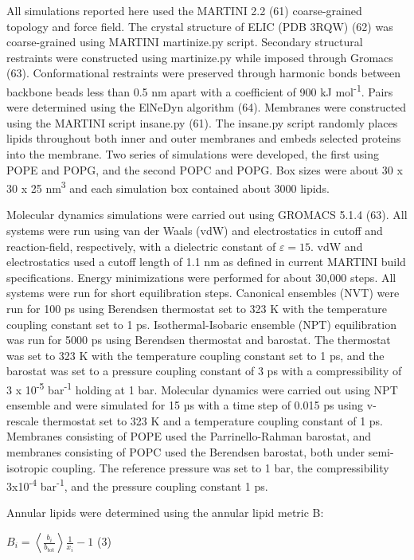 All simulations reported here used the MARTINI 2.2 (61) coarse-grained
topology and force field. The crystal structure of ELIC (PDB 3RQW) (62)
was coarse-grained using MARTINI martinize.py script. Secondary
structural restraints were constructed using martinize.py while imposed
through Gromacs (63). Conformational restraints were preserved through
harmonic bonds between backbone beads less than 0.5 nm apart with a
coefficient of 900 kJ mol\textsuperscript{-1}. Pairs were determined
using the ElNeDyn algorithm (64). Membranes were constructed using the
MARTINI script insane.py (61). The insane.py script randomly places
lipids throughout both inner and outer membranes and embeds selected
proteins into the membrane. Two series of simulations were developed,
the first using POPE and POPG, and the second POPC and POPG. Box sizes
were about 30 x 30 x 25 nm\textsuperscript{3} and each simulation box
contained about 3000 lipids.

Molecular dynamics simulations were carried out using GROMACS 5.1.4
(63). All systems were run using van der Waals (vdW) and electrostatics
in cutoff and reaction-field, respectively, with a dielectric constant
of \(\varepsilon = 15\). vdW and electrostatics used a cutoff length of
1.1 nm as defined in current MARTINI build specifications. Energy
minimizations were performed for about 30,000 steps. All systems were
run for short equilibration steps. Canonical ensembles (NVT) were run
for 100 ps using Berendsen thermostat set to 323 K with the temperature
coupling constant set to 1 ps. Isothermal-Isobaric ensemble (NPT)
equilibration was run for 5000 ps using Berendsen thermostat and
barostat. The thermostat was set to 323 K with the temperature coupling
constant set to 1 ps, and the barostat was set to a pressure coupling
constant of 3 ps with a compressibility of 3 x 10\textsuperscript{-5}
bar\textsuperscript{-1} holding at 1 bar. Molecular dynamics were
carried out using NPT ensemble and were simulated for 15 µs with a time
step of 0.015 ps using v-rescale thermostat set to 323 K and a
temperature coupling constant of 1 ps. Membranes consisting of POPE used
the Parrinello-Rahman barostat, and membranes consisting of POPC used
the Berendsen barostat, both under semi-isotropic coupling. The
reference pressure was set to 1 bar, the compressibility
3x10\textsuperscript{-4} bar\textsuperscript{-1}, and the pressure
coupling constant 1 ps.

Annular lipids were determined using the annular lipid metric B:

\(B_{i} = \left\langle \frac{b_{i}}{b_{\text{tot}}} \right\rangle\frac{1}{x_{i}} - 1\)
(3)

